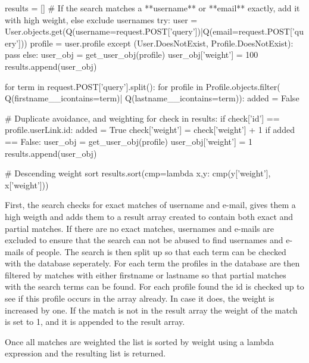 \begin{snippet}[language=Python,caption=Weighting of the search results]
results = []
# If the search matches a **username** or **email** exactly, add it with high weight, else exclude usernames
try:
	user = User.objects.get(Q(username=request.POST['query'])|Q(email=request.POST['query']))
	profile = user.profile
except (User.DoesNotExist, Profile.DoesNotExist):
	pass
else:
	user_obj = get_user_obj(profile)
	user_obj['weight'] = 100
	results.append(user_obj)

for term in request.POST['query'].split():
	for profile in Profile.objects.filter(
																 Q(firstname__icontains=term)|
																 Q(lastname__icontains=term)):
		added = False
		
		# Duplicate avoidance, and weighting
		for check in results:
			if check['id'] == profile.userLink.id:
				added = True
				check['weight'] = check['weight'] + 1
		if added == False:
			user_obj = get_user_obj(profile)
			user_obj['weight'] = 1
			results.append(user_obj)
					
# Descending weight sort
results.sort(cmp=lambda x,y: cmp(y['weight'], x['weight'])) 
\end{snippet}

First, the search checks for exact matches of username and e-mail, gives them a high weigth and adds them to a result array created to contain both exact and partial matches. If there are no exact matches, usernames and e-mails are excluded to ensure that the search can not be abused to find usernames and e-mails of people.
The search is then split up so that each term can be checked with the database seperately. For each term the profiles in the database are then filtered by matches with either firstname or lastname so that partial matches with the search terms can be found. For each profile found the id is checked up to see if this profile occurs in the array already. In case it does, the weight is increased by one. If the match is not in the result array the weight of the match is set to 1, and it is appended to the result array.

Once all matches are weighted the list is sorted by weight using a lambda expression and the resulting list is returned. 